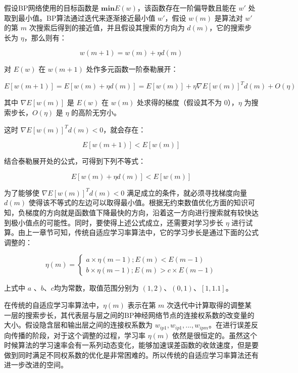 \documentclass[UTF8]{ctexart}
\begin{document}
假设BP网络使用的目标函数是 $\mathbf{min} E(w)$，该函数存在一阶偏导数且能在 $w'$ 处取到最小值。BP算法通过迭代来逐渐接近最小值 $w'$，假设 $w(m)$ 是算法对 $w'$ 的第 $m$ 次搜索后得到的接近值，并且假设其搜索的方向为 $d(m)$，它的搜索步长为 $\eta$，那么则有： \par

\begin{equation}
w(m+1)=w(m)+ \eta d(m)
\end{equation}

对 $E(w)$ 在 $w(m+1)$ 处作多元函数一阶泰勒展开：

\begin{equation}
E[w(m+1)]=E[w(m)+\eta d(m)]=E[w(m)] + \eta \nabla E[w(m)]^Td(m) + O(\eta)
\end{equation}

其中 $\nabla E[w(m)]$ 是 $E(w)$ 在 $w(m)$ 处求得的梯度（假设其不为 $0$），$\eta$ 为搜索步长，$O(\eta)$ 是 $\eta$ 的高阶无穷小。 \par

这时 $\nabla E[w(m)]^Td(m) < 0$，就会存在：

\begin{equation}
E[w(m+1)] < E[w(m)]
\end{equation}

结合泰勒展开处的公式，可得到下列不等式：

\begin{equation}
E[w(m) + \eta d(m)] < E[w(m)]
\end{equation}

为了能够使 $\nabla E[w(m)]^T d(m) < 0$ 满足成立的条件，就必须寻找梯度向量 $d(m)$ 使得该不等式的左边可以取得最小值。根据无约束数值优化方面的知识可知，负梯度的方向就是函数值下降最快的方向，沿着这一方向进行搜索就有较快达到极小值点的可能性。同时，要使得上述公式成立，还需要对学习步长 $\eta$ 进行试算。由上一章节可知，传统自适应学习率算法中，它的学习步长是通过下面的公式调整的：

\begin{equation}
\eta (m) = \begin{cases}
a \times \eta (m-1) ; E(m) < E(m-1) \\
b \times \eta (m-1) ; E(m) > c \times E(m-1)
\end{cases}
\end{equation}

上式中 $a$ 、$b$、$c$均为常数，取值范围分别为 $(1,2)$、$(0,1)$、$[1,1.1]$。 \par

在传统的自适应学习率算法中，$\eta(m)$ 表示在第 $m$ 次迭代中计算取得的调整某一层的搜索步长，其代表层与层之间的BP神经网络节点的连接权系数的改变量的大小。假设隐含层和输出层之间的连接权系数为 $w_{ip1},w_{ip1},...,w_{ipm}$。在进行误差反向传播的阶段，对于这个调整的过程，学习率 $\eta(m)$ 依然是很恒定的。虽然这个时候算法的学习速率会有一系列动态变化，能够加速误差函数的收敛速度，但是要做到同时满足不同权系数的优化是非常困难的。所以传统的自适应学习率算法还有进一步改进的空间。 \par
\end{document}
